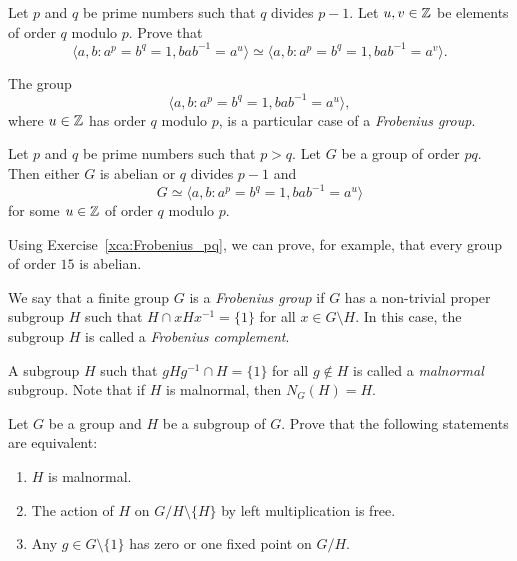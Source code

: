 \begin{exercise}
    Let $p$ and $q$ be prime numbers such that $q$ divides $p-1$. Let
    $u,v\in\mathbb{Z}$ be elements of order $q$ modulo $p$. 
    Prove that 
    \[
    \langle a,b:a^p=b^q=1,bab^{-1}=a^u\rangle
    \simeq \langle a,b:a^p=b^q=1,bab^{-1}=a^v\rangle.
    \]
\end{exercise}

The group   
\[
\langle a,b:a^p=b^q=1,bab^{-1}=a^u\rangle,
\]
where $u\in\mathbb{Z}$ has order $q$ modulo $p$, 
is a particular case of a  
\emph{Frobenius group}. 

\begin{exercise}
\label{xca:Frobenius_pq}
    Let $p$ and $q$ be prime numbers such that $p>q$. Let  
    $G$ be a group of order $pq$. Then either $G$ is abelian or
    $q$ divides $p-1$ and 
    \[
    G\simeq \langle a,b:a^p=b^q=1,bab^{-1}=a^u\rangle
    \]
    for some $u\in\mathbb{Z}$ of order
    $q$ modulo $p$. 
\end{exercise}


Using Exercise~\ref{xca:Frobenius_pq}, we can prove, for example, that every group of order $15$ is abelian. 

\begin{definition}
  We say that a finite group $G$ is a 
  \emph{Frobenius group} if $G$ 
  has a non-trivial proper subgroup $H$ such that $H\cap
  xHx^{-1}=\{1\}$ for all $x\in G\setminus H$. In this case, the subgroup 
  $H$ is called a \emph{Frobenius complement}.
\end{definition}

A subgroup $H$ such that $gHg^{-1}\cap H=\{1\}$ for all 
$g\not\in H$ is called a \emph{malnormal} subgroup. 
Note that if $H$ is malnormal, then $N_G(H)=H$. 

\begin{exercise}
\label{xca:malnormal}
    Let $G$ be a group and $H$ be a subgroup of $G$. Prove that the following statements are equivalent: 
    \begin{enumerate}
        \item $H$ is malnormal. 
        \item The action of $H$ 
            on $G/H\setminus\{H\}$ by left multiplication is free. 
        \item Any $g\in G\setminus\{1\}$ has zero
            or one fixed point on $G/H$. 
    \end{enumerate}
\end{exercise}

